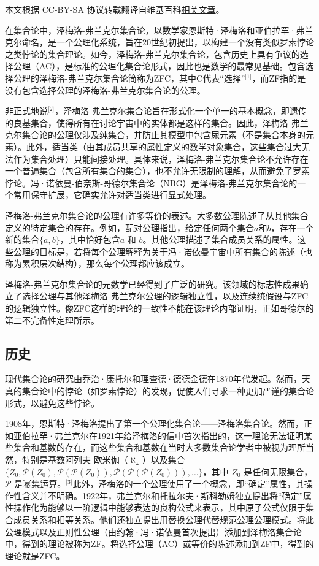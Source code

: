 
本文根据 CC-BY-SA 协议转载翻译自维基百科\href{https://en.wikipedia.org/wiki/Zermelo\%E2\%80\%93Fraenkel_set_theory}{相关文章}。

在集合论中，泽梅洛-弗兰克尔集合论，以数学家恩斯特·泽梅洛和亚伯拉罕·弗兰克尔命名，是一个公理化系统，旨在20世纪初提出，以构建一个没有类似罗素悖论之类悖论的集合理论。如今，泽梅洛-弗兰克尔集合论，包含历史上具有争议的选择公理（AC），是标准的公理化集合论形式，因此也是数学的最常见基础。包含选择公理的泽梅洛-弗兰克尔集合论简称为ZFC，其中C代表“选择”\(^\text{[1]}\)，而ZF指的是没有包含选择公理的泽梅洛-弗兰克尔集合论的公理。

非正式地说\(^\text{[2]}\)，泽梅洛-弗兰克尔集合论旨在形式化一个单一的基本概念，即遗传的良基集合，使得所有在讨论宇宙中的实体都是这样的集合。因此，泽梅洛-弗兰克尔集合论的公理仅涉及纯集合，并防止其模型中包含尿元素（不是集合本身的元素）。此外，适当类（由其成员共享的属性定义的数学对象集合，这些集合过大无法作为集合处理）只能间接处理。具体来说，泽梅洛-弗兰克尔集合论不允许存在一个普遍集合（包含所有集合的集合），也不允许无限制的理解，从而避免了罗素悖论。冯·诺依曼-伯奈斯-哥德尔集合论（NBG）是泽梅洛-弗兰克尔集合论的一个常用保守扩展，它确实允许对适当类进行显式处理。

泽梅洛-弗兰克尔集合论的公理有许多等价的表述。大多数公理陈述了从其他集合定义的特定集合的存在。例如，配对公理指出，给定任何两个集合\(a\)和\(b\)，存在一个新的集合\(\{a,b\}\)，其中恰好包含\(a\) 和 \(b\)。其他公理描述了集合成员关系的属性。这些公理的目标是，若将每个公理解释为关于冯·诺依曼宇宙中所有集合的陈述（也称为累积层次结构），那么每个公理都应该成立。

泽梅洛-弗兰克尔集合论的元数学已经得到了广泛的研究。该领域的标志性成果确立了选择公理与其他泽梅洛-弗兰克尔公理的逻辑独立性，以及连续统假设与ZFC的逻辑独立性。像ZFC这样的理论的一致性不能在该理论内部证明，正如哥德尔的第二不完备性定理所示。
\subsection{历史}
现代集合论的研究由乔治·康托尔和理查德·德德金德在1870年代发起。然而，天真的集合论中的悖论（如罗素悖论）的发现，促使人们寻求一种更加严谨的集合论形式，以避免这些悖论。

1908年，恩斯特·泽梅洛提出了第一个公理化集合论——泽梅洛集合论。然而，正如亚伯拉罕·弗兰克尔在1921年给泽梅洛的信中首次指出的，这一理论无法证明某些集合和基数的存在，而这些集合和基数在当时大多数集合论学者中被视为理所当然，特别是基数阿列夫-欧米伽（\(\aleph_\omega\)）以及集合 \(\{Z_0, \mathcal{P}(Z_0), \mathcal{P}(\mathcal{P}(Z_0)), \mathcal{P}(\mathcal{P}(\mathcal{P}(Z_0))), \dots\}\)，其中 \(Z_0\) 是任何无限集合，\(\mathcal{P}\) 是幂集运算。\(^\text{[3]}\)此外，泽梅洛的一个公理使用了一个概念，即“确定”属性，其操作性含义并不明确。1922年，弗兰克尔和托拉尔夫·斯科勒姆独立提出将“确定”属性操作化为能够以一阶逻辑中能够表达的良构公式来表示，其中原子公式仅限于集合成员关系和相等关系。他们还独立提出用替换公理代替规范公理公理模式。将此公理模式以及正则性公理（由约翰·冯·诺依曼首次提出）添加到泽梅洛集合论中，得到的理论被称为ZF。将选择公理（AC）或等价的陈述添加到ZF中，得到的理论就是ZFC。


